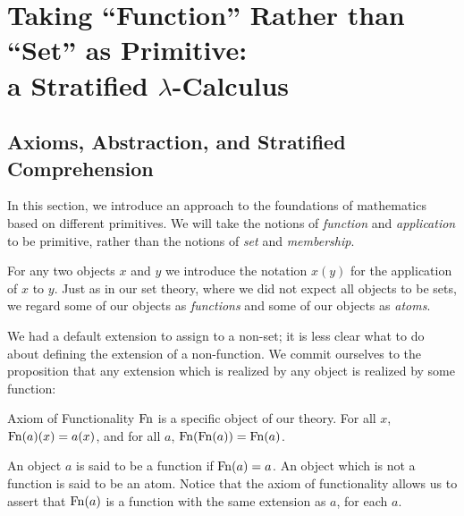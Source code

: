 \chapter[Stratified Lambda-Calculus]{Taking ``Function'' Rather
than\\ ``Set'' as Primitive:\\  a Stratified
$\lambda$-Calculus}



\section[Abstraction and Comprehension]{Axioms,
Abstraction, and Stratified\\ Comprehension}

In this section, we introduce an approach to the foundations of
mathematics based on different primitives.  We will take the notions
of {\itshape function\/} and {\itshape application\/} to be
primitive, rather than the notions of {\itshape set\/} and {\itshape
membership\/}.

For any two objects $x$ and $y$ we introduce the notation $x(y)$ for
the application of $x$ to $y$.  Just as in our set theory, where we
did not expect all objects to be sets, we regard some of our objects
as {\itshape functions\/} and some of our objects as {\itshape
atoms\/}.

We had a default extension to assign to a non-set; it is less clear
what to do about defining the extension of a non-function.  We
commit 
ourselves to the proposition that any extension which is realized by
any object is realized by some function:

\begin{axiom}{Axiom of Functionality}
 $\mathop{\mathrm{Fn}}$ is a specific object of our theory.
 For all $x$, $\mathop{\mathrm{Fn}}(a)(x) = a(x)$, and for all $a$, $\mathop{\mathrm{Fn}}(\mathop{\mathrm{Fn}}(a)) =
 \mathop{\mathrm{Fn}}(a)$.
\end{axiom}

\begin{definition}
 An object $a$ is said to be a {\upshape function} if\/
 $\mathop{\mathrm{Fn}}(a) = a$.  An object which is not a function is said to be an
 {\upshape atom\/}.  Notice that the axiom of functionality allows us to
 assert that $\mathop{\mathrm{Fn}}(a)$ is a function with the same extension as $a$, for each $a$.
\end{definition}


